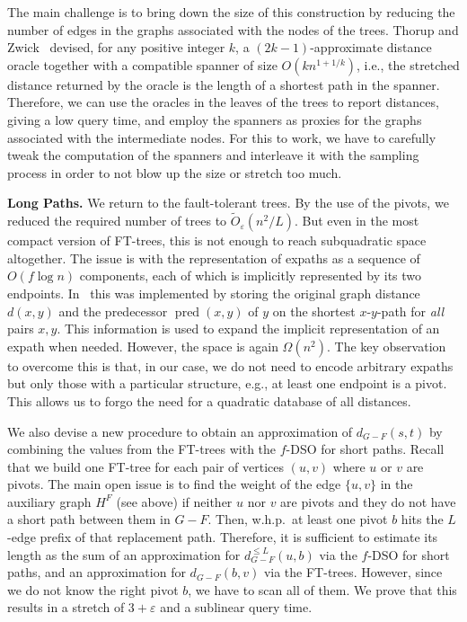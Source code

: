\documentclass{article}\usepackage[a4paper,margin=20mm]{geometry}
\DeclareMathOperator{\pred}{pred}
\newcommand*{\Otilde}{\widetilde{O}}
\renewcommand{\le}{\leqslant}
\begin{document}
The main challenge is to bring down the size of this construction 
by reducing the number of edges in the graphs associated
with the nodes of the trees.
Thorup and Zwick~\cite{ThorupZ05} devised, for any positive integer $k$,
a $(2k{-}1)$-approximate distance oracle together with a compatible spanner of size $O(kn^{1+1/k})$, 
i.e., the stretched distance returned by the oracle 
is the length of a shortest path in the spanner.
Therefore, we can use the oracles in the leaves of the trees to report distances,
giving a low query time,
and employ the spanners as proxies for the graphs associated with the intermediate nodes.
For this to work, we have to carefully tweak the computation of the spanners
and interleave it with the sampling process 
in order to not blow up the size or stretch too much.
\vspace*{.5em}

\noindent
\textbf{Long Paths.}
We return to the fault-tolerant trees.
By the use of the pivots, we reduced the required number of trees to $\Otilde_{\varepsilon}(n^2/L)$.
But even in the most compact version of FT-trees, this is not enough 
to reach subquadratic space altogether.
The issue is with the representation of expaths as a sequence of $O(f \log n)$ components,
each of which is implicitly represented by its two endpoints.
In~\cite{ChCoFiKa17} this was implemented by storing the original graph distance $d(x,y)$ 
and the predecessor $\pred(x,y)$ of $y$ on the shortest $x$-$y$-path for \emph{all} pairs $x,y$.
This information is used to expand the implicit representation of an expath when needed.
However, the space is again $\Omega(n^2)$.
The key observation to overcome this is that, in our case,
we do not need to encode arbitrary expaths but only those with a particular structure,
e.g., at least one endpoint is a pivot.
This allows us to forgo the need for a quadratic database of all distances. 

We also devise a new procedure to obtain an approximation of $d_{G-F}(s,t)$
by combining the values from the FT-trees with the $f$-DSO for short paths.
Recall that we build one FT-tree for each pair of vertices $(u,v)$ where $u$ or $v$ are pivots.
The main open issue is to find the weight of the edge $\{u,v\}$ in the auxiliary graph $H^F$ 
(see above)
if neither $u$ nor $v$ are pivots and they do not have a short path between them in $G-F$.
Then, w.h.p.\ at least one pivot $b$ hits the $L$-edge prefix of that replacement path.
Therefore, it is sufficient to estimate its length as the sum of an approximation for 
$d_{G-F}^{\le L}(u,b)$ via the $f$-DSO for short paths, 
and an approximation for $d_{G-F}(b,v)$ via the FT-trees.
However, since we do not know the right pivot $b$, we have to scan all of them.
We prove that this results in a stretch of $3+\varepsilon$ and a sublinear query time.
\end{document}

